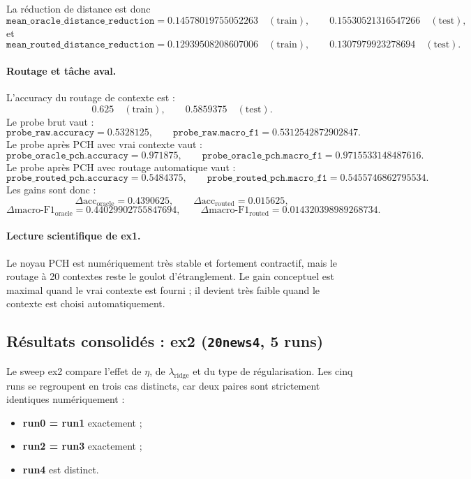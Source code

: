 La réduction de distance est donc
\[
\texttt{mean\_oracle\_distance\_reduction}
=
0.14578019755052263\quad(\text{train}),
\qquad
0.15530521316547266\quad(\text{test}),
\]
et
\[
\texttt{mean\_routed\_distance\_reduction}
=
0.12939508208607006\quad(\text{train}),
\qquad
0.1307979923278694\quad(\text{test}).
\]

\paragraph{Routage et tâche aval.}
L’accuracy du routage de contexte est :
\[
0.625\quad(\text{train}),\qquad 0.5859375\quad(\text{test}).
\]
Le probe brut vaut :
\[
\texttt{probe\_raw.accuracy}=0.5328125,
\qquad
\texttt{probe\_raw.macro\_f1}=0.5312542872902847.
\]
Le probe après PCH avec vrai contexte vaut :
\[
\texttt{probe\_oracle\_pch.accuracy}=0.971875,
\qquad
\texttt{probe\_oracle\_pch.macro\_f1}=0.9715533148487616.
\]
Le probe après PCH avec routage automatique vaut :
\[
\texttt{probe\_routed\_pch.accuracy}=0.5484375,
\qquad
\texttt{probe\_routed\_pch.macro\_f1}=0.5455746862795534.
\]
Les gains sont donc :
\[
\Delta\text{acc}_{\text{oracle}}=0.4390625,
\qquad
\Delta\text{acc}_{\text{routed}}=0.015625,
\]
\[
\Delta\text{macro-F1}_{\text{oracle}}=0.44029902755847694,
\qquad
\Delta\text{macro-F1}_{\text{routed}}=0.014320398989268734.
\]

\paragraph{Lecture scientifique de ex1.}
Le noyau PCH est numériquement très stable et fortement contractif, mais le routage à 20 contextes reste le goulot d’étranglement. Le gain conceptuel est maximal quand le vrai contexte est fourni ; il devient très faible quand le contexte est choisi automatiquement.

\subsection{Résultats consolidés : ex2 (\texttt{20news4}, 5 runs)}

Le sweep ex2 compare l’effet de \(\eta\), de \(\lambda_{\mathrm{ridge}}\) et du type de régularisation. Les cinq runs se regroupent en trois cas distincts, car deux paires sont strictement identiques numériquement :

\begin{itemize}
    \item \textbf{run0 = run1} exactement ;
    \item \textbf{run2 = run3} exactement ;
    \item \textbf{run4} est distinct.
\end{itemize}

